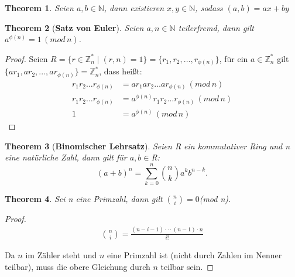 \documentclass[12pt,oneside]{article}
\newtheorem{theorem}{Theorem}[section]
\theoremstyle{remark}
\theoremstyle{definition}
\begin{document}

\begin{theorem}
Seien $a,b \in \mathbb{N}$, dann existieren $x,y \in \mathbb{N}$, sodass $(a,b) = ax + by$ 
\end{theorem}

\smallskip

\begin{theorem}[\textbf{Satz von Euler}]\label{Th_1}
Seien $a,n \in \mathbb{N}$ teilerfremd, \newline dann gilt $a^{\phi(n)} = 1 \, (mod \, n) $.
\end{theorem}

\begin{proof}
    
Seien $R =\{ r \in \mathbb{Z}_{n}^{*} \mid (r,n) = 1 \} =  \{r_{1}, r_{2},...,r_{\phi(n)} \}$, für ein $a \in \mathbb{Z}_{n}^{*}$ gilt $\{ar_{1},ar_{2},...,ar_{\phi(n)}\} = \mathbb{Z}_{n}^{*}$, dass heißt:\newline\newline
\begin{align*}
    r_{1}r_{2} \dots r_{\phi(n)} &= ar_{1}ar_{2} \dots ar_{\phi(n)} \, (mod \, n)\\
    r_{1}r_{2} \dots r_{\phi(n)} &= a^{\phi(n)} r_{1}r_{2} \dots r_{\phi(n)} \, (mod \, n) \\
    1 &= a^{\phi(n)} \, (mod \, n)
\end{align*}

\end{proof}

\smallskip

\begin{theorem}[\textbf{Binomischer Lehrsatz}]\label{Th_3}
Seien R ein kommutativer Ring und n eine natürliche Zahl, dann gilt für $a,b \in $R:\newline\newline
 \begin{equation}
     (a + b)^n  = \sum_{k=0}^n {n \choose k} a^k b^{n-k}.
 \end{equation}
\end{theorem}

\smallskip

\begin{theorem}\label{th_25}
Sei n eine Primzahl, dann gilt ${n \choose i} = 0 $(mod n).
\end{theorem}

\begin{proof}
\begin{align*}\label{modb}
    {n \choose i} = \frac{(n - i - 1) \cdot  \cdot  \cdot (n - 1) \cdot n }{i!}
\end{align*}

Da $n$ im Zähler steht und $n$ eine Primzahl ist (nicht durch Zahlen im Nenner teilbar), muss die obere Gleichung  durch $n$ teilbar sein. 
\end{proof}
\end{document}

